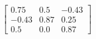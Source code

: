 \documentclass[preview]{standalone}
\begin{document}
\begin{align*}
\left[ \begin{array}{ccc}0.75 & 0.5 & -0.43 \\ -0.43 & 0.87 & 0.25 \\ 0.5 & 0.0 & 0.87\end{array} \right]
\end{align*}
\end{document}
